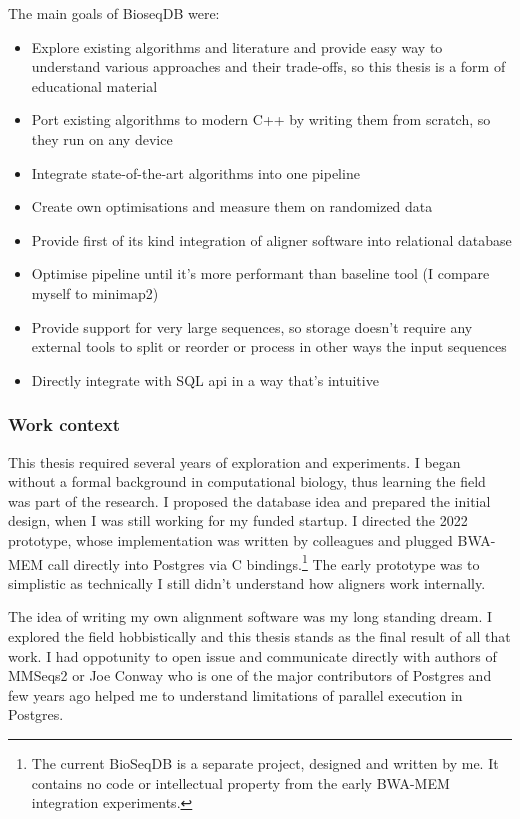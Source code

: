   The main goals of BioseqDB were:
  \begin{itemize}
    \item Explore existing algorithms and literature and provide easy way to understand various approaches and their trade-offs, so this thesis is a form of educational material
    \item Port existing algorithms to modern C++ by writing them from scratch, so they run on any device
    \item Integrate state-of-the-art algorithms into one pipeline
    \item Create own optimisations and measure them on randomized data
    \item Provide first of its kind integration of aligner software into relational database
    \item Optimise pipeline until it's more performant than baseline tool (I compare myself to minimap2)
    \item Provide support for very large sequences, so storage doesn't require any external tools to split or reorder or process in other ways the input sequences
    \item Directly integrate with SQL api in a way that's intuitive
  \end{itemize}

\subsubsection{Work context}

    This thesis required several years of exploration and experiments.
    I began without a formal background in computational biology, thus
    learning the field was part of the research. I proposed the database
    idea and prepared the initial design, when I was still working for my funded startup.
    I directed the 2022 prototype, whose implementation was written by colleagues and plugged BWA-MEM call directly into Postgres via C bindings.\footnote{\fontsize{7.5}{9}\selectfont 
    The current BioSeqDB is a separate project, designed and written by me.
    It contains no code or intellectual property from the early BWA-MEM integration experiments.}
    The early prototype was to simplistic as technically I still didn't understand how aligners work internally.

    The idea of writing my own alignment software was my long standing dream. I explored the field hobbistically and this thesis stands as the final result of all that work. 
    I had oppotunity to open issue and communicate directly with authors of MMSeqs2 or Joe Conway who is one of the major contributors of Postgres and few years ago helped me 
    to understand limitations of parallel execution in Postgres.

